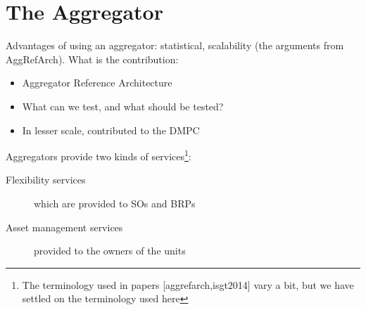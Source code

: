 \chapter{The Aggregator} %
\label{cha:aggregator}
Advantages of using an aggregator: statistical, scalability (the arguments from AggRefArch). What is the contribution:
\begin{itemize}
	\item Aggregator Reference Architecture
	\item What can we test, and what should be tested?
	\item In lesser scale, contributed to the DMPC
\end{itemize}

Aggregators provide two kinds of services\footnote{The terminology used in papers [aggrefarch,isgt2014] vary a bit, but we have settled on the terminology used here}:
\begin{description}
	\item[Flexibility services] which are provided to SOs and BRPs
	\item[Asset management services] provided to the owners of the units
\end{description}
